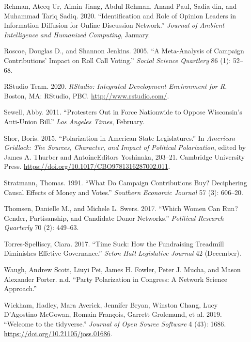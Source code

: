 \documentclass[12pt,]{article}
\begin{document}
\leavevmode\hypertarget{ref-rehman2020}{}%
Rehman, Ateeq Ur, Aimin Jiang, Abdul Rehman, Anand Paul, Sadia din, and
Muhammad Tariq Sadiq. 2020. ``Identification and Role of Opinion Leaders
in Information Diffusion for Online Discussion Network.'' \emph{Journal
of Ambient Intelligence and Humanized Computing}, January.

\leavevmode\hypertarget{ref-roscoe2005}{}%
Roscoe, Douglas D., and Shannon Jenkins. 2005. ``A Meta-Analysis of
Campaign Contributions' Impact on Roll Call Voting.'' \emph{Social
Science Quartlery} 86 (1): 52--68.

\leavevmode\hypertarget{ref-rstudio}{}%
RStudio Team. 2020. \emph{RStudio: Integrated Development Environment
for R}. Boston, MA: RStudio, PBC. \url{http://www.rstudio.com/}.

\leavevmode\hypertarget{ref-sewell2011}{}%
Sewell, Abby. 2011. ``Protesters Out in Force Nationwide to Oppose
Wisconsin's Anti-Union Bill.'' \emph{Los Angeles Times}, February.

\leavevmode\hypertarget{ref-shor2015}{}%
Shor, Boris. 2015. ``Polarization in American State Legislatures.'' In
\emph{American Gridlock: The Sources, Character, and Impact of Political
Polarization}, edited by James A. Thurber and AntoineEditors Yoshinaka,
203--21. Cambridge University Press.
\url{https://doi.org/10.1017/CBO9781316287002.011}.

\leavevmode\hypertarget{ref-stratmann1991}{}%
Stratmann, Thomas. 1991. ``What Do Campaign Contributions Buy?
Deciphering Causal Effects of Money and Votes.'' \emph{Southern Economic
Journal} 57 (3): 606--20.

\leavevmode\hypertarget{ref-thomsen2017}{}%
Thomsen, Danielle M., and Michele L. Swers. 2017. ``Which Women Can Run?
Gender, Partisanship, and Candidate Donor Networks.'' \emph{Political
Research Quarterly} 70 (2): 449--63.

\leavevmode\hypertarget{ref-torres-spelliscy2017}{}%
Torres-Spelliscy, Ciara. 2017. ``Time Suck: How the Fundraising
Treadmill Diminishes Effetive Governance.'' \emph{Seton Hall Legislative
Journal} 42 (December).

\leavevmode\hypertarget{ref-waugh2009}{}%
Waugh, Andrew Scott, Liuyi Pei, James H. Fowler, Peter J. Mucha, and
Mason Alexander Porter. n.d. ``Party Polarization in Congress: A Network
Science Approach.''

\leavevmode\hypertarget{ref-tidyverse}{}%
Wickham, Hadley, Mara Averick, Jennifer Bryan, Winston Chang, Lucy
D'Agostino McGowan, Romain François, Garrett Grolemund, et al. 2019.
``Welcome to the tidyverse.'' \emph{Journal of Open Source Software} 4
(43): 1686. \url{https://doi.org/10.21105/joss.01686}.
\end{document}
